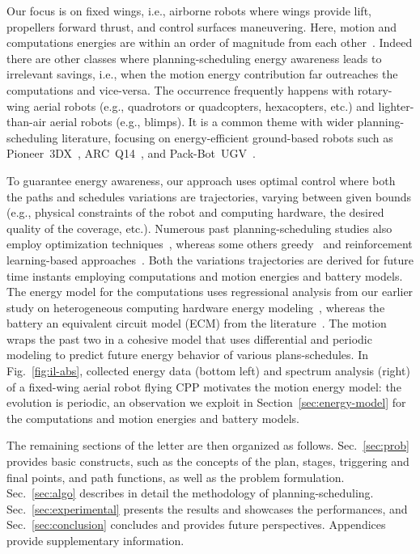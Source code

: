 \documentclass[letterpaper,10pt,journal,twoside]{IEEEtran}
\theoremstyle{definition}
\begin{document}
Our focus is on fixed wings, i.e., airborne robots where wings provide lift, propellers forward thrust, and control surfaces maneuvering. Here, motion and computations energies are within an order of magnitude from each other~\cite{seewald2020mechanical}. Indeed there are other classes where planning-scheduling energy awareness leads to irrelevant savings, i.e., when the motion energy contribution far outreaches the computations and vice-versa. The occurrence frequently happens with rotary-wing aerial robots (e.g., quadrotors or quadcopters, hexacopters, etc.) and lighter-than-air aerial robots (e.g., blimps). It is a common theme with wider planning-scheduling literature, focusing on energy-efficient ground-based robots such as Pioneer~3DX~\cite{ho2018towards,ho2019learning,ho2019qos,mei2005case}, ARC~Q14~\cite{ondruska2015scheduled,lahijanian2018resource}, and Pack-Bot~UGV~\cite{sadrpour2013mission}.

To guarantee energy awareness, our approach uses optimal control where both the paths and schedules variations are trajectories, varying between given bounds (e.g., physical constraints of the robot and computing hardware, the desired quality of the coverage, etc.). Numerous past planning-scheduling studies also employ optimization techniques~\cite{brateman2006energy,zhang2007low,ondruska2015scheduled,lahijanian2018resource}, whereas some others greedy~\cite{mei2005case,sudhakar2020balancing,sadrpour2013mission} and reinforcement learning-based approaches~\cite{ho2019qos,ho2018towards,ho2019learning}. Both the variations trajectories are derived for future time instants employing computations and motion energies and battery models. The energy model for the computations uses regressional analysis from our earlier study on heterogeneous computing hardware energy modeling~\cite{seewald2019coarse,seewald2019component}, whereas the battery an equivalent circuit model (ECM) from the literature~\cite{he2011evaluation,hinz2019comparison,mousavi2014various}. The motion wraps the past two in a cohesive model that uses differential and periodic modeling to predict future energy behavior of various plans-schedules. In Fig.~\ref{fig:il-abs}, collected energy data (bottom left) and spectrum analysis (right) of a fixed-wing aerial robot flying CPP motivates the motion energy model: the evolution is periodic, an observation we exploit in Section~\ref{sec:energy-model} for the computations and motion energies and battery models.

The remaining sections of the letter are then organized as follows. Sec.~\ref{sec:prob} provides basic constructs, such as the concepts of the plan, stages, triggering and final points, and path functions, as well as the problem formulation. Sec.~\ref{sec:algo} describes in detail the methodology of planning-scheduling. Sec.~\ref{sec:experimental} presents the results and showcases the performances, and Sec.~\ref{sec:conclusion} concludes and provides future perspectives. Appendices provide supplementary information.
\end{document}
